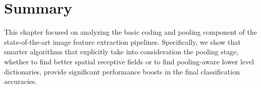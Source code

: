 \section{Summary}

This chapter focused on analyzing the basic coding and pooling component of the state-of-the-art image feature extraction pipelines. Specifically, we show that smarter algorithms that explicitly take into consideration the pooling stage, whether to find better spatial receptive fields or to find pooling-aware lower level dictionaries, provide significant performance boosts in the final classification accuracies.

%

